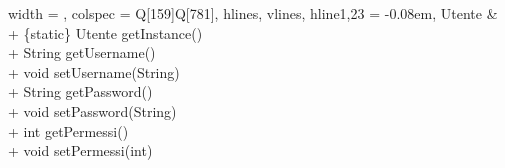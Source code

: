 \begin{longtblr}[
    label = none,
    entry = none,
  ]{
    width = \linewidth,
    colspec = {Q[159]Q[781]},
    hlines,
    vlines,
    hline{1,23} = {-}{0.08em},
  }
  Utente                 & {+ \{static\} Utente getInstance()\\+ String getUsername()\\+ void setUsername(String)\\+ String getPassword()\\+ void setPassword(String)\\+ int getPermessi()\\+ void setPermessi(int)}                                                                                                                                                                                                                                                                                                                                                                                                                                                                                                                                                                                                                                                                                                                                                                                                                                                                                                                                                                                                                                                                                                                                                                                                                                                                                                                                                                                                                                                                                                                                                                                                                                                                                                       \\

\end{longtblr}
